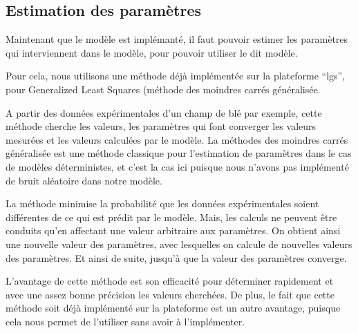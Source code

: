\subsection{Estimation des paramètres}

Maintenant que le modèle est implémanté, il faut pouvoir estimer les paramètres qui interviennent dans le modèle, pour pouvoir utiliser le dit modèle.

Pour cela, nous utilisons une méthode déjà implémentée sur la plateforme ``lgs'', pour Generalized Least Squares (méthode des moindres carrés généralisée. 

A partir des données expérimentales d'un champ de blé par exemple, cette méthode cherche les valeurs, les paramètres qui font converger les valeurs mesurées et les valeurs calculées par le modèle. 
La méthodes des moindres carrés généralisée est une méthode classique pour l'estimation de paramètres dans le cas de modèles déterministes, et c'est la cas ici puisque nous n'avons pas implémenté de bruit aléatoire dans notre modèle.

La méthode minimise la probabilité que les données expérimentales soient différentes de ce qui est prédit par le modèle. 
Mais, les calculs ne peuvent être conduits qu'en affectant une valeur arbitraire aux paramètres. On obtient ainsi une nouvelle valeur des paramètres, avec lesquelles on calcule de nouvelles valeurs des paramètres. Et ainsi de suite, jusqu'à que la valeur des paramètres converge.

L'avantage de cette méthode est son efficacité pour déterminer rapidement et avec une assez bonne précision les valeurs cherchées.
De plus, le fait que cette méthode soit déjà implémenté sur la plateforme est un autre avantage, puisque cela nous permet de l'utiliser sans avoir à l'implémenter. 

